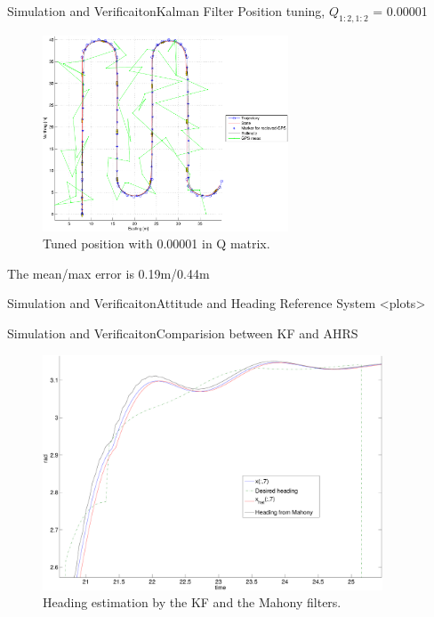 \documentclass[10pt,handout]{beamer}
\begin{document}
\begin{frame}{Simulation and Verificaiton}{Kalman Filter}
Position tuning, $Q_{1:2,1:2}$ = 0.00001
  \begin{figure}
    \includegraphics[width=0.65\textwidth]{../../code/matlab/q0,00001}
    \caption{\scriptsize Tuned position with 0.00001 in Q matrix.}
    \label{fig:q0.00001}
  \end{figure}
  The mean/max error is 0.19m/0.44m
\end{frame}

\begin{frame}{Simulation and Verificaiton}{Attitude and Heading Reference System}
<plots>
\end{frame}

\begin{frame}{Simulation and Verificaiton}{Comparision between KF and AHRS}
  \begin{figure}
    \includegraphics[width=0.9\textwidth]{../../code/matlab/mahonyvskf}
    \caption{\scriptsize Heading estimation by the KF and the Mahony filters.}
    \label{fig:mavskf}
  \end{figure}
\end{frame}
\end{document}
